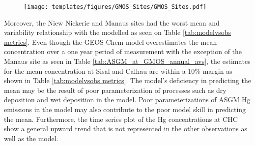 \begin{figure}[H]
\texttt{[image: templates/figures/GMOS\_Sites/GMOS\_Sites.pdf]}
\centering
{}
\label{fig:GMOSvsGC}
\end{figure}
\FloatBarrier

\begin{flushleft}
Moreover, the Niew Nickerie and Manaus sites had the worst mean and variability relationship with the modelled \hg as seen on Table \ref{tab:modelvsobs metrics}. Even though the GEOS-Chem model overestimates the mean concentration over a one year period of measurement with the exception of the Manaus site as seen in Table \ref{tab:ASGM_at_GMOS_annual_avs}, the estimates for the mean concentration at Sisal and Calhau are within a 10\% margin as shown in Table \ref{tab:modelvsobs metrics}. The model's deficiency in predicting the mean may be the result of poor parameterization of processes such as dry deposition and wet deposition in the model. Poor parameterizations of ASGM Hg emissions in the model may also  contribute to the poor model skill in predicting the mean. Furthermore, the time series plot of the Hg concentrations at CHC show a general upward trend that is not represented in the other observations as well as the model. 
\end{flushleft}


\begin{flushleft}
  
\end{flushleft}

